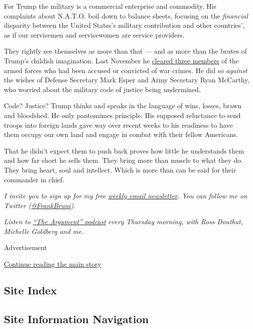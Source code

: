 For Trump the military is a commercial enterprise and commodity. His
complaints about N.A.T.O. boil down to balance sheets, focusing on the
\emph{financial} disparity between the United States's military
contribution and other countries', as if our servicemen and servicewomen
are service providers.

They rightly see themselves as more than that --- and as more than the
brutes of Trump's childish imagination. Last November he
\href{https://www.nytimes3xbfgragh.onion/2019/11/15/us/trump-pardons.html}{cleared
three members} of the armed forces who had been accused or convicted of
war crimes. He did so \emph{against} the wishes of Defense Secretary
Mark Esper and Army Secretary Ryan McCarthy, who worried about the
military code of justice being undermined.

Code? Justice? Trump thinks and speaks in the language of wins, losses,
brawn and bloodshed. He only pantomimes principle. His supposed
reluctance to send troops into foreign lands gave way over recent weeks
to his readiness to have them occupy our own land and engage in combat
with their fellow Americans.

That he didn't expect them to push back proves how little he understands
them and how far short he sells them. They bring more than muscle to
what they do. They bring heart, soul and intellect. Which is more than
can be said for their commander in chief.

\emph{I invite you to sign up for my free}
\href{https://www.nytimes3xbfgragh.onion/newsletters/frank-bruni}{\emph{weekly
email newsletter}}\emph{. You can follow me on Twitter
(}\href{https://twitter.com/FrankBruni}{\emph{@FrankBruni}}\emph{).}

\emph{Listen to}
\href{https://www.nytimes3xbfgragh.onion/column/the-argument}{\emph{``The
Argument'' podcast}} \emph{every Thursday morning, with Ross Douthat,
Michelle Goldberg and me.}

Advertisement

\protect\hyperlink{after-bottom}{Continue reading the main story}

\hypertarget{site-index}{%
\subsection{Site Index}\label{site-index}}

\hypertarget{site-information-navigation}{%
\subsection{Site Information
Navigation}\label{site-information-navigation}}

